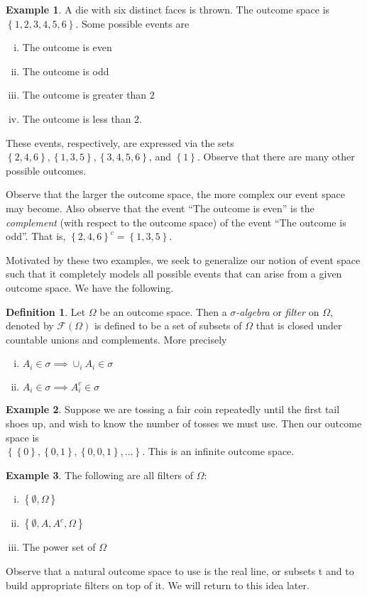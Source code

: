 \documentclass[12pt]{amsbook}
\newcommand{\filter}{\mathcal{F}}
\theoremstyle{plain}
\theoremstyle{definition}
\newtheorem*{definition}{Definition}
\newtheorem*{example}{Example}
\theoremstyle{remark}
\numberwithin{equation}{section}  %
\numberwithin{equation}{section}  %
\begin{document}
\begin{example}
	A die with six distinct faces is thrown. The outcome space is
	$ \left\{ 1, 2, 3, 4, 5, 6 \right\} $. Some possible events are
	\begin{enumerate}[(i)]
		\item The outcome is even
		\item The outcome is odd
		\item The outcome is greater than $2$
		\item The outcome is less than $2$.
	\end{enumerate}
	These events, respectively, are expressed via the sets
	$ \left\{ 2, 4, 6 \right\} , \left\{ 1,3,5 \right\} , \left\{ 3, 4, 5, 6
	\right\}$, and $\left\{ 1 \right\}$.
	Observe that there are many other possible outcomes.
\end{example}
Observe that the larger the outcome space, the more complex
our event space may become. Also observe that the event
``The outcome is even'' is the \emph{complement} (with respect to the
outcome space) of
the event ``The outcome is odd''. That is,
${\left\{ 2,4,6 \right\}}^c
= \left\{ 1,3,5 \right\}$.

Motivated by these two examples, we seek to generalize our notion of
event space such that it completely models all possible events
that can arise from a given outcome space. We have the following.
\begin{definition}
	Let $\Omega$ be an outcome space. Then a \emph{$\sigma$-algebra}
	or \emph{filter} on $\Omega$, denoted by $\filter(\Omega)$ is defined to be 
	a
	set of subsets of $\Omega$ that is closed under countable
	unions and complements.
	More precisely
	\begin{enumerate}[(i)]
		\item $ A_i \in  \sigma \implies \cup_i A_i \in \sigma$
		\item $A_i \in \sigma \implies A_i^c \in \sigma$
	\end{enumerate}
\end{definition}
\begin{example}
	Suppose we are tossing a fair coin repeatedly until the first tail shoes up,
	and wish to know the number of tosses we must use. Then our outcome space
	is \\ $ \left\{ \left\{ 0 \right\} , \left\{ 0,1 \right\} , \left\{ 0,0,1
	\right\},\ldots \right\}$. This is an infinite outcome space.
\end{example}
\begin{example} The following are all filters of $\Omega$:
	\begin{enumerate}[(i)]
		\item $\left\{ \emptyset, \Omega \right\}$
		\item $\left\{ \emptyset, A, A^c, \Omega \right\}$
		\item The power set of $\Omega$
	\end{enumerate}
\end{example}Observe that a natural outcome space to use is the real line, or subsets
t and to build appropriate filters on top of it. We will return
to this idea later.
\end{document}

